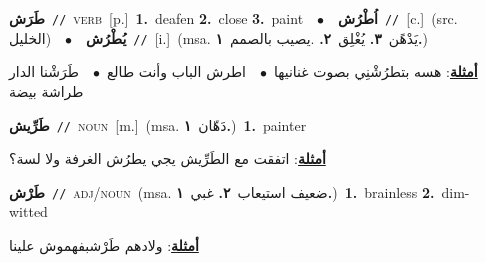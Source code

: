 \documentclass[10pt,a4paper,twoside]{article} %
\begin{document}
\begin{multicols}{2}
{\setlength\topsep{0pt}\textbf{\foreignlanguage{arabic}{طَرَش}}\ {\color{gray}\texttt{//}\color{black}}\ \textsc{verb}\ [p.]\ \textbf{1.}~deafen  \textbf{2.}~close  \textbf{3.}~paint\ \ $\bullet$\ \ \setlength\topsep{0pt}\textbf{\foreignlanguage{arabic}{اُطْرُش}}\ {\color{gray}\texttt{//}\color{black}}\ [c.]\ (src. \color{gray}\foreignlanguage{arabic}{الخليل}\color{black})\ \ $\bullet$\ \ \setlength\topsep{0pt}\textbf{\foreignlanguage{arabic}{يُطْرُش}}\ {\color{gray}\texttt{//}\color{black}}\ [i.]\ \color{gray}(msa. \foreignlanguage{arabic}{يَدْهًن}~\foreignlanguage{arabic}{\textbf{٣.}}  \foreignlanguage{arabic}{يُغْلِق}~\foreignlanguage{arabic}{\textbf{٢.}}  .\foreignlanguage{arabic}{يصيب بالصمم}~\foreignlanguage{arabic}{\textbf{١.}})\color{black}\  \begin{flushright}\color{gray}\foreignlanguage{arabic}{\textbf{\underline{\foreignlanguage{arabic}{أمثلة}}}: هسه بتطرُشْنِي بصوت غنانيها\ $\bullet$\ \  اطرش الباب وأنت طالع\ $\bullet$\ \  طَرَشْنا الدار طراشة بيضة}\end{flushright}\color{black}} \vspace{2mm}

{\setlength\topsep{0pt}\textbf{\foreignlanguage{arabic}{طَرِّيش}}\ {\color{gray}\texttt{//}\color{black}}\ \textsc{noun}\ [m.]\ \color{gray}(msa. \foreignlanguage{arabic}{دَهّان}~\foreignlanguage{arabic}{\textbf{١.}})\color{black}\ \textbf{1.}~painter\  \begin{flushright}\color{gray}\foreignlanguage{arabic}{\textbf{\underline{\foreignlanguage{arabic}{أمثلة}}}: اتفقت مع الطَرِّيش يجي يطرُش الغرفة ولا لسة؟}\end{flushright}\color{black}} \vspace{2mm}

{\setlength\topsep{0pt}\textbf{\foreignlanguage{arabic}{طَرْش}}\ {\color{gray}\texttt{//}\color{black}}\ \textsc{adj/noun}\ \color{gray}(msa. \foreignlanguage{arabic}{ضعيف استيعاب}~\foreignlanguage{arabic}{\textbf{٢.}}  \foreignlanguage{arabic}{غبي}~\foreignlanguage{arabic}{\textbf{١.}})\color{black}\ \textbf{1.}~brainless  \textbf{2.}~dim-witted\  \begin{flushright}\color{gray}\foreignlanguage{arabic}{\textbf{\underline{\foreignlanguage{arabic}{أمثلة}}}: ولادهم طَرْشبفهموش علينا}\end{flushright}\color{black}} \vspace{2mm}


\end{multicols}
\end{document}
